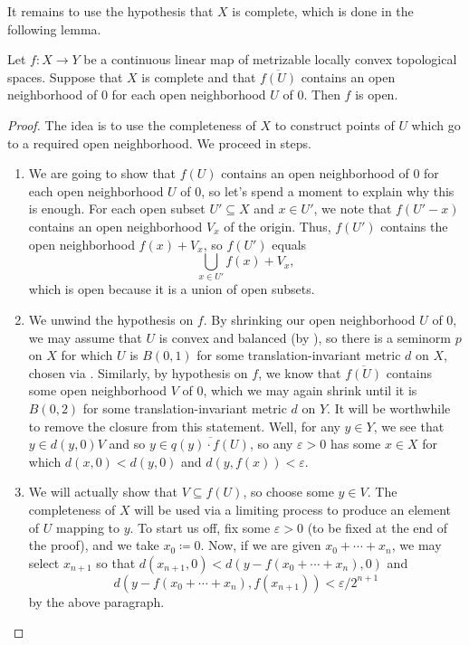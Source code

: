 \documentclass[notes.tex]{subfiles}
\begin{document}
It remains to use the hypothesis that $X$ is complete, which is done in the following lemma.
\begin{lemma} \label{lem:omt-use-complete}
	Let $f\colon X\to Y$ be a continuous linear map of metrizable locally convex topological spaces. Suppose that $X$ is complete and that $\overline{f(U)}$ contains an open neighborhood of $0$ for each open neighborhood $U$ of $0$. Then $f$ is open.
\end{lemma}
\begin{proof}
	The idea is to use the completeness of $X$ to construct points of $U$ which go to a required open neighborhood. We proceed in steps.
	\begin{enumerate}
		\item We are going to show that $f(U)$ contains an open neighborhood of $0$ for each open neighborhood $U$ of $0$, so let's spend a moment to explain why this is enough. For each open subset $U'\subseteq X$ and $x\in U'$, we note that $f(U'-x)$ contains an open neighborhood $V_x$ of the origin. Thus, $f(U')$ contains the open neighborhood $f(x)+V_x$, so $f(U')$ equals
		\[\bigcup_{x\in U'}f(x)+V_x,\]
		which is open because it is a union of open subsets.

		\item We unwind the hypothesis on $f$. By shrinking our open neighborhood $U$ of $0$, we may assume that $U$ is convex and balanced (by ), so there is a seminorm $p$ on $X$ for which $U$ is $B(0,1)$ for some translation-invariant metric $d$ on $X$, chosen via .
		Similarly, by hypothesis on $f$, we know that $\overline{f(U)}$ contains some open neighborhood $V$ of $0$, which we may again shrink until it is $B(0,2)$ for some translation-invariant metric $d$ on $Y$.
		It will be worthwhile to remove the closure from this statement. Well, for any $y\in Y$, we see that $y\in d(y,0)V$ and so $y\in\overline{q(y)\cdot f(U)}$, so any $\varepsilon>0$ has some $x\in X$ for which $d(x,0)<d(y,0)$ and $d(y,f(x))<\varepsilon$.

		\item We will actually show that $V\subseteq f(U)$, so choose some $y\in V$. The completeness of $X$ will be used via a limiting process to produce an element of $U$ mapping to $y$. To start us off, fix some $\varepsilon>0$ (to be fixed at the end of the proof), and we take $x_0\coloneqq0$. Now, if we are given $x_0+\cdots+x_n$, we may select $x_{n+1}$ so that $d(x_{n+1},0)<d(y-f(x_0+\cdots+x_n),0)$ and
		\[d(y-f(x_0+\cdots+x_n),f(x_{n+1}))<\varepsilon/2^{n+1}\]
		by the above paragraph.


\end{enumerate}
\end{proof}
\end{document}
